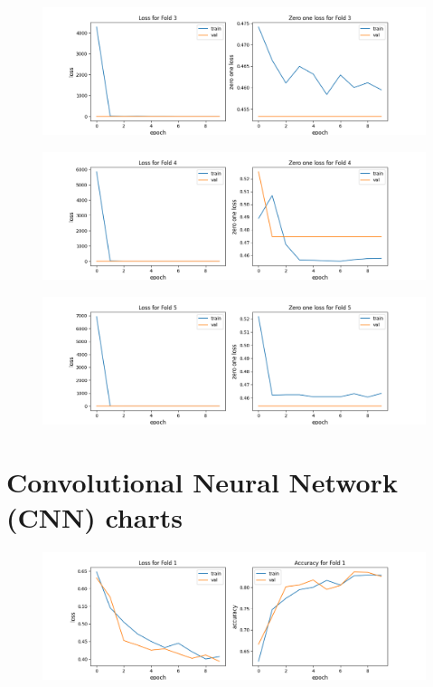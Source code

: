 \begin{appendices}
\begin{figure}[hbtp]
\centering
\includegraphics[scale=0.5]{../Images/mlp02_fold_3_zeroplot.png}
\end{figure}
\begin{figure}[hbtp]

\centering
\includegraphics[scale=0.5]{../Images/mlp02_fold_4_zeroplot.png}
\end{figure}
\begin{figure}[hbtp]

\centering
\includegraphics[scale=0.5]{../Images/mlp02_fold_5_zeroplot.png}
\end{figure}
\chapter{Convolutional Neural Network (CNN) charts}
\begin{figure}[hbtp]

\centering
\includegraphics[scale=0.5]{../Images/cnn01_fold_1_plot.png}
\end{figure}
\begin{figure}[hbtp]


\end{figure}
\end{appendices}
